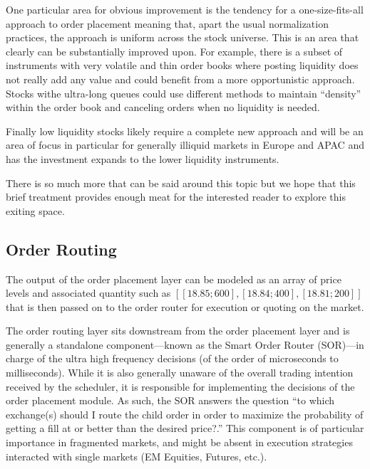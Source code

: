 One particular area for obvious improvement is the tendency for a one-size-fits-all approach to order placement meaning that, apart the usual normalization practices, the approach is uniform across the stock universe. This is an area that clearly can be substantially improved upon. For example, there is a subset of instruments with very volatile and thin order books where posting liquidity does not really add any value and could benefit from a more opportunistic approach. Stocks withe ultra-long queues could use different methods to maintain ``density'' within the order book and canceling orders when no liquidity is needed.


Finally low liquidity stocks likely require a complete new approach and will be an area of focus in particular for generally illiquid markets in Europe and APAC and has the investment expands to the lower liquidity instruments.


There is so much more that can be said around this topic but we hope that this brief treatment provides enough meat for the interested reader to explore this exiting space.



\subsection{Order Routing}

The output of the order placement layer can be modeled as an array of price levels and associated quantity such as $[ [18.85 ; 600], [18.84 ; 400], [18.81 ; 200] ]$ that is then passed on to the order router for execution or quoting on the market.


The order routing layer sits downstream from the order placement layer and is generally a standalone component---known as the Smart Order Router (SOR)---in charge of the ultra high frequency decisions (of the order of microseconds to milliseconds). While it is also generally unaware of the overall trading intention received by the scheduler, it is responsible for implementing the decisions of the order placement module. As such, the SOR answers the question ``to which exchange(s) should I route the child order in order to maximize the probability of getting a fill at or better than the desired price?.'' This component is of particular importance in fragmented markets, and might be absent in execution strategies interacted with single markets (EM Equities, Futures, etc.).


